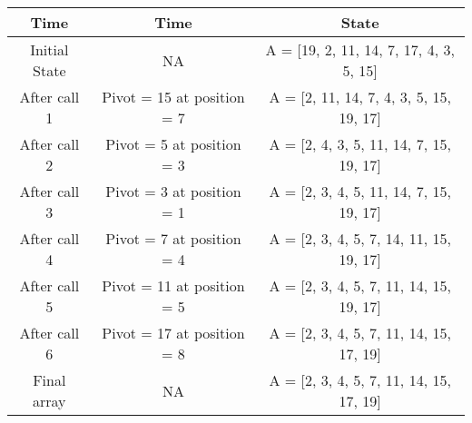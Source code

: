 \begin{center}
\begin{tabular}{| c | c | c |}
\hline
\textbf{Time} & \textbf{Time} & \textbf{State} \\
\hline
Initial State & NA & A = [19, 2, 11, 14, 7, 17, 4, 3, 5, 15]\\ 
\hline
After call 1& Pivot = 15 at position = 7 & A = [2, 11, 14, 7, 4, 3, 5, 15, 19, 17]\\ 
\hline
After call 2& Pivot = 5 at position = 3 & A = [2, 4, 3, 5, 11, 14, 7, 15, 19, 17]\\ 
\hline
After call 3& Pivot = 3 at position = 1 & A = [2, 3, 4, 5, 11, 14, 7, 15, 19, 17]\\ 
\hline
After call 4& Pivot = 7 at position = 4 & A = [2, 3, 4, 5, 7, 14, 11, 15, 19, 17]\\ 
\hline
After call 5& Pivot = 11 at position = 5 & A = [2, 3, 4, 5, 7, 11, 14, 15, 19, 17]\\ 
\hline
After call 6& Pivot = 17 at position = 8 & A = [2, 3, 4, 5, 7, 11, 14, 15, 17, 19]\\ 
\hline
Final array & NA & A = [2, 3, 4, 5, 7, 11, 14, 15, 17, 19]\\ 
\hline
\end{tabular}
\end{center}
